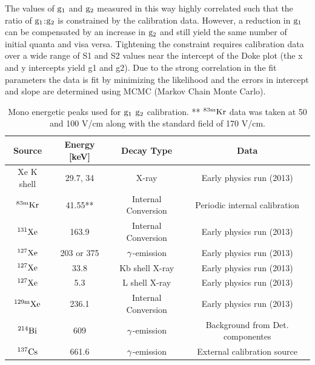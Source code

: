 The values of $\rm g_1$ and $\rm g_2$ measured in this way highly correlated such that the ratio of $\rm g_1$:$\rm g_2$ is constrained by the calibration data. However, a reduction in $\rm g_1$ can be compensated by an increase in $\rm g_2$ and still yield the same number of initial quanta and visa versa. Tightening the constraint requires calibration data over a wide range of S1 and S2 values near the intercept of the Doke plot (the x and y intercepts yield g1 and g2). Due to the strong correlation in the fit parameters the data is fit by minimizing the likelihood and the errors in intercept and slope are determined using MCMC (Markov Chain Monte Carlo). 



\begin{table}[h!]
\centering
\footnotesize
\begin{tabular}{|c|c|c|c|}
\hline
Source & Energy [keV] &Decay Type & Data \\ [0.5ex] %
\hline
Xe K shell  & 29.7, 34 	 		& X-ray							& Early physics run (2013)					\\ \hline
 $\rm ^{83m}Kr$ 	& 41.55**		& Internal Conversion		& Periodic internal calibration	\\ \hline
 $\rm ^{131}Xe$ 	& 163.9		& Internal Conversion			& Early physics run (2013) \\ \hline
$\rm ^{127}Xe$ 	& 203 or 375	& $\rm \gamma$-emission	& Early physics run (2013)\\ \hline
$\rm ^{127}Xe$		& 33.8			& Kb shell X-ray 				& Early physics run (2013)		\\ \hline
$\rm ^{127}Xe$	     & 5.3			& L shell X-ray 					& Early physics run (2013)\\ \hline
$\rm ^{129m}Xe$	& 236.1		& Internal Conversion 		& Early physics run (2013)	\\ \hline
$\rm ^{214}Bi	$	& 609 			& $\rm \gamma$-emission	& Background from Det. componentes			 \\ \hline
 $\rm ^{137}Cs$	& 661.6		&  $\rm \gamma$-emission 	& External calibration source			\\ [0.5ex] 
\hline
\end{tabular}
\caption{Mono energetic peaks used for $\rm g_1$ $\rm g_2$ calibration. ** $\rm^{83m}Kr$ data was taken at 50 and 100 V/cm along with the standard field of 170 V/cm.}
\label{table:Cal_lines}
\end{table}




